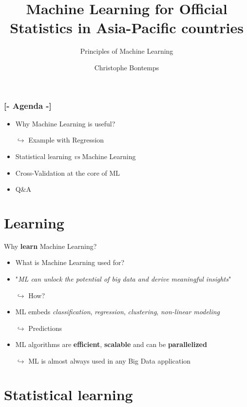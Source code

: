 \documentclass[xcolor=x11names,compress, aspectratio=169]{beamer}
\title{\textcolor{siap}{Machine Learning for Official Statistics in Asia-Pacific countries\\ \vspace{0.5cm} }}
\subtitle{\textcolor{brique}{\Large{Principles of Machine Learning}}}
\author{\textcolor{siap}{Christophe Bontemps}}
\institute{ \texttt{[image: SIAP\_logo\_Big.png]}}
\date{}
\renewcommand{\(}{\begin{columns}}
\renewcommand{\)}{\end{columns}}
\newcommand{\<}[1]{\begin{column}{#1}}
\renewcommand{\>}{\end{column}}
\begin{document}
\begin{frame}
  \titlepage
\end{frame}


\begin{frame} %
\frametitle{\textcolor{brique}{[-  \textbf{Agenda} -]}}
\begin{itemize}[<+-|alert@+>]
   \item Why Machine Learning is useful?
   \item[$\hookrightarrow$] Example with Regression
   \item Statistical learning \textit{vs} Machine Learning
   \item Cross-Validation at the core of ML
   \item Q\&A
\end{itemize}
\end{frame}


\section{Learning}

\begin{frame}{Why \textbf{learn} Machine Learning?}

\pause

\begin{itemize}[<+->]
    \item What is Machine Learning used for?
    \item "\emph{ML can unlock the potential of big data and derive meaningful insights}"
    \item[$\hookrightarrow$] How?
    \item ML embeds \emph{classification}, \emph{regression}, \emph{clustering}, \emph{non-linear modeling}
    \item[$\hookrightarrow$] Predictions
    \item ML algorithms are  \textbf{efficient}, \textbf{scalable} and can be \textbf{parallelized}
    \item[$\hookrightarrow$] ML is almost always used in any Big Data application

\end{itemize}
\end{frame}



\section{Statistical  learning}
\end{document}
